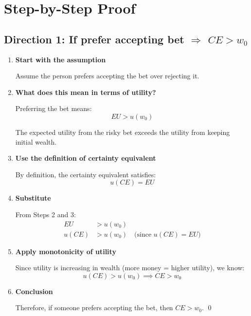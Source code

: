 \documentclass[12pt]{article}
\begin{document}
\newpage

\section*{Step-by-Step Proof}

\subsection*{Direction 1: If prefer accepting bet $\Rightarrow$ $CE > w_0$}

\begin{enumerate}[leftmargin=*, label=\textbf{Step \arabic*:}]
    \item \textbf{Start with the assumption}

    Assume the person prefers accepting the bet over rejecting it.

    \vspace{0.3cm}

    \item \textbf{What does this mean in terms of utility?}

    Preferring the bet means:
    \begin{equation}
    EU > u(w_0)
    \end{equation}

    The expected utility from the risky bet exceeds the utility from keeping initial wealth.

    \vspace{0.3cm}

    \item \textbf{Use the definition of certainty equivalent}

    By definition, the certainty equivalent satisfies:
    \begin{equation}
    u(CE) = EU
    \end{equation}

    \vspace{0.3cm}

    \item \textbf{Substitute}

    From Steps 2 and 3:
    \begin{align}
    EU &> u(w_0) \\
    u(CE) &> u(w_0) \quad \text{(since } u(CE) = EU\text{)}
    \end{align}

    \vspace{0.3cm}

    \item \textbf{Apply monotonicity of utility}

    Since utility is increasing in wealth (more money = higher utility), we know:
    \begin{equation}
    u(CE) > u(w_0) \implies CE > w_0
    \end{equation}

    \vspace{0.3cm}

    \item \textbf{Conclusion}

    Therefore, if someone prefers accepting the bet, then $CE > w_0$. \qed
\end{enumerate}
\end{document}

